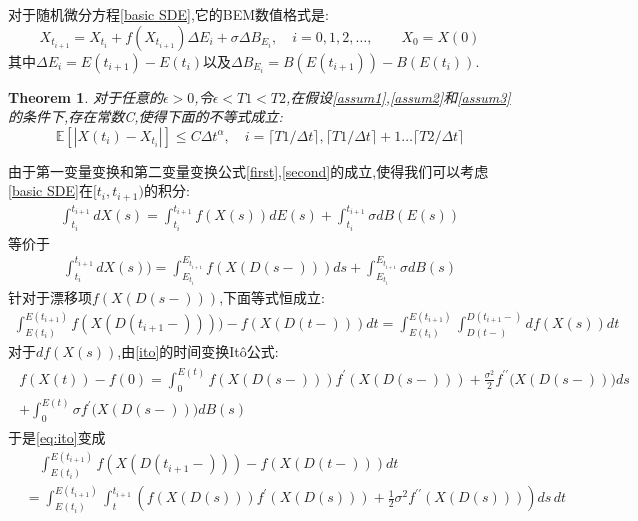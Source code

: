 \documentclass[12pt,final]{article}
\makeatletter
\theoremstyle{plain}
\renewcommand{\proofname}{Proof}
\newtheorem{Theorem}{Theorem}[section]   %
\theoremstyle{Definition}
\theoremstyle{Remark}
\renewenvironment{proof}[1][\proofname]{\par
	\pushQED{\qed}%
	\normalfont \topsep6\p@\@plus6\p@\relax
	\trivlist\item[\hskip\labelsep
	\bfseries #1\@addpunct{\,:\,}]\ignorespaces
}{%
	\popQED\endtrivlist\@endpefalse
}
\makeatother
\begin{document}
	对于随机微分方程\cref{basic SDE},它的BEM数值格式是:
	\begin{equation}\label{eq:1}
		X_{t_{i+1}}=X_{t_i}+f(X_{t_{i+1}})\Delta E_{i}+\sigma\Delta B_{E_{i}},\quad i=0,1,2,\ldots,\qquad X_0=X(0)
	\end{equation}
	其中$\Delta E_{i}=E(t_{i+1})-E(t_i)$以及$\Delta B_{E_{i}}=B(E{(t_{i+1})})-B(E({t_i}))$.
	\begin{Theorem}\label{main th}
		对于任意的$\epsilon>0$,令$\epsilon < T1 < T2$,在假设\cref{assum1},\cref{assum2}和\cref{assum3}的条件下,存在常数C,使得下面的不等式成立:
		$$\mathbb{E}[|X({t_i})-X_{t_i}|]\le C\Delta t^\alpha,\quad i=\lceil T1/\Delta t \rceil,\lceil T1/\Delta t \rceil+1 \ldots \lceil T2/\Delta t \rceil$$
	\end{Theorem}
	\begin{proof}
		由于第一变量变换和第二变量变换公式\cref{first},\cref{second}的成立,使得我们可以考虑\cref{basic SDE}在$[t_i,t_{i+1})$的积分:
		\begin{align}
			\int_{t_i}^{t_{i+1}}dX(s)=\int_{t_i}^{t_{i+1}}f(X(s))dE(s)+\int_{t_i}^{t_{i+1}}\sigma dB(E(s))
		\end{align}
		等价于
		\begin{align}
			\int_{t_i}^{t_{i+1}}dX(s))=\int_{E_{t_i}}^{E_{t_{i+1}}}f(X(D(s-)))ds+\int_{E_{t_i}}^{E_{t_{i+1}}}\sigma dB(s)
		\end{align}
		针对于漂移项$f(X(D(s-)))$,下面等式恒成立:
		\begin{align}\label{eq:ito}
			\int_{E(t_i)}^{E(t_{i+1})} f(X(D(t_{i+1}-)))) - f(X(D(t-))) dt = \int_{E(t_i)}^{E(t_{i+1})} \int^{D(t_{i+1}-)}_{D(t-)} df(X(s)) dt
		\end{align}
		对于$df(X(s))$,由\cref{ito}的时间变换It\^{o}公式:
		\begin{align*}
			\begin{gathered}
				f(X(t))-f(0)=\int_{0}^{E(t)}f(X(D(s-)))f^{\prime}\left(X(D(s-))\right)+\frac{\sigma^{2}}{2}f^{\prime\prime}\big(X(D(s-))\big)ds \\
				+\int_{0}^{E(t)}\sigma f^{\prime}\big(X(D(s-))\big)dB(s)
			\end{gathered}
		\end{align*}
		于是\cref{eq:ito}变成
		\begin{equation}\label{eq:ito1}
			\begin{aligned}
				&\quad\int_{E(t_i)}^{E(t_{i+1})} f(X(D(t_{i+1}-))) - f(X(D(t-))) dt \\
				&= \int_{E(t_i)}^{E(t_{i+1})} \int_{t}^{t_{i+1}} \left( f(X(D(s))) f^{\prime}(X(D(s))) + \frac{1}{2} \sigma^2 f^{\prime\prime}(X(D(s))) \right) ds \, dt\\

\end{aligned}
\end{equation}
\end{proof}
\end{document}
